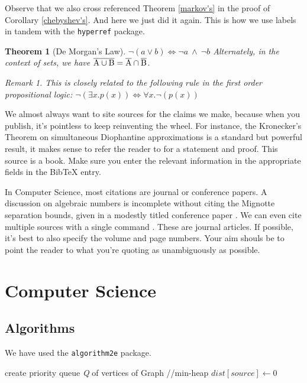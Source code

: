 \documentclass[10pt, Computer Modern]{article}
\newtheorem{theorem}{Theorem}
\theoremstyle{remark}
\newtheorem*{remark}{Remark}
\begin{document}
Observe that we also cross referenced Theorem \ref{markov's} in the proof of Corollary \ref{chebyshev's}. And here we just did it again. This is how we use labels in tandem with the \verb!hyperref! package.
\begin{theorem}[De Morgan's Law]
\label{morgan}
$\neg (a \lor b) \iff \neg a~\land~\neg b$ 
Alternately, in the context of sets, we have $\overline{\rm A \cup B} = \overline{\rm A} \cap \overline{\rm B}$.



\begin{remark}
This is closely related to the following rule in the first order propositional logic: $\neg(\exists x.p(x)) \iff \forall x.\neg(p(x))$
\end{remark}
\end{theorem}	



We almost always want to site sources for the claims we make, because when you publish, it's pointless to keep reinventing the wheel. For instance, the Kronecker's Theorem on simultaneous Diophantine approximations is a standard but powerful result, it makes sense to refer the reader to \cite[Chap. 7, Sec. 1.3, Prop. 7]{bourbaki1966general} for a statement and proof. This source is a book. Make sure you enter the relevant information in the appropriate fields in the BibTeX entry.


In Computer Science, most citations are journal or conference papers. A discussion on algebraic numbers is incomplete without citing the Mignotte separation bounds, given in a modestly titled conference paper \cite{mignotte1982some}. We can even cite multiple sources with a single command \cite{bell2007positivity,renegar1992computational}. These are journal articles. If possible, it's best to also specify the volume and page numbers. Your aim shouls be to point the reader to what you're quoting as unambiguously as possible.
\clearpage
\renewcommand{\baselinestretch}{1}
\section{Computer Science}
\label{cs}
	\subsection{Algorithms}


	We have used the \verb!algorithm2e! package.


	\begin{algorithm}
	\DontPrintSemicolon
	create priority queue \textit{Q} of vertices of Graph //min-heap\;
	$dist[source]\leftarrow 0$\;
	\;
	\caption{Dijkstra's Algorithm}\label{shortest_distance}
	\end{algorithm}
\end{document}
